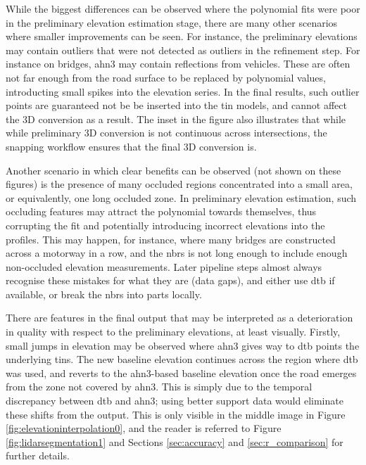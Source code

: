 While the biggest differences can be observed where the polynomial fits were poor in the preliminary elevation estimation stage, there are many other scenarios where smaller improvements can be seen. For instance, the preliminary elevations may contain outliers that were not detected as outliers in the refinement step. For instance on bridges, \ac{ahn3} may contain reflections from vehicles. These are often not far enough from the road surface to be replaced by polynomial values, introducting small spikes into the elevation series. In the final results, such outlier points are guaranteed not be be inserted into the \ac{tin} models, and cannot affect the 3D conversion as a result. The inset in the figure also illustrates that while while preliminary 3D conversion is not continuous across intersections, the snapping workflow ensures that the final 3D conversion is.

Another scenario in which clear benefits can be observed (not shown on these figures) is the presence of many occluded regions concentrated into a small area, or equivalently, one long occluded zone. In preliminary elevation estimation, such occluding features may attract the polynomial towards themselves, thus corrupting the fit and potentially introducing incorrect elevations into the profiles. This may happen, for instance, where many bridges are constructed across a motorway in a row, and the \ac{nbrs} is not long enough to include enough non-occluded elevation measurements. Later pipeline steps almost always recognise these mistakes for what they are (data gaps), and either use \ac{dtb} if available, or break the \ac{nbrs} into parts locally.

There are features in the final output that may be interpreted as a deterioration in quality with respect to the preliminary elevations, at least visually. Firstly, small jumps in elevation may be observed where \ac{ahn3} gives way to \ac{dtb} points the underlying \ac{tin}s. The new baseline elevation continues across the region where \ac{dtb} was used, and reverts to the \ac{ahn3}-based baseline elevation once the road emerges from the zone not covered by \ac{ahn3}. This is simply due to the temporal discrepancy between \ac{dtb} and \ac{ahn3}; using better support data would eliminate these shifts from the output. This is only visible in the middle image in Figure \ref{fig:elevationinterpolation0}, and the reader is referred to Figure \ref{fig:lidarsegmentation1} and Sections \ref{sec:accuracy} and \ref{sec:r_comparison} for further details.

